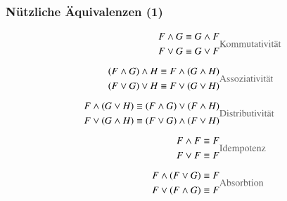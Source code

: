 \documentclass[aspectratio=1610,onlymath]{beamer}
\begin{document}
\begin{frame}\frametitle{Nützliche Äquivalenzen (1)}

\begin{align*}
\begin{split}
F\wedge G & \equiv G\wedge F\\
F\vee G & \equiv G\vee F
\end{split}
		& \text{\textcolor{devilscss}{Kommutativität}} \\[1ex]
%
\begin{split}
(F\wedge G)\wedge H & \equiv F\wedge (G\wedge H)\\
(F\vee G)\vee H & \equiv F\vee (G\vee H)
\end{split}
		& \text{\textcolor{devilscss}{Assoziativität}} \\[1ex]
%
\begin{split}
F\wedge (G\vee H) & \equiv (F\wedge G) \vee (F\wedge H)\\
F\vee (G\wedge H) & \equiv (F\vee G)\wedge (F\vee H)
\end{split}
		& \text{\textcolor{devilscss}{Distributivität}} \\[1ex]
%
\begin{split}
F\wedge F & \equiv F\\
F\vee F & \equiv F
\end{split}
		& \text{\textcolor{devilscss}{Idempotenz}} \\[1ex]
%
\begin{split}
F\wedge (F\vee G) & \equiv F\\
F\vee (F\wedge G) & \equiv F
\end{split}
		& \text{\textcolor{devilscss}{Absorbtion}}
\end{align*}

\end{frame}
\end{document}

